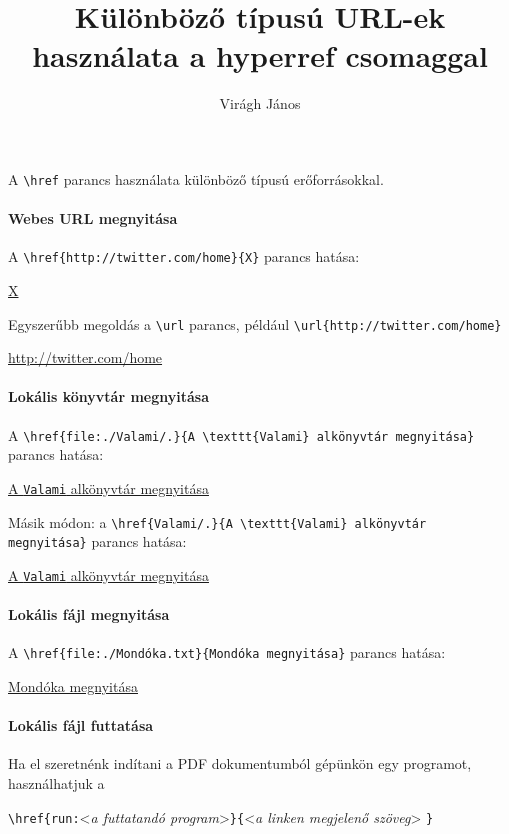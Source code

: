 \documentclass{article}
\title{Különböző típusú URL-ek használata a hyperref csomaggal}
\author{Virágh János}
\begin{document}
\maketitle
A \verb!\href! parancs használata különböző típusú erőforrásokkal.
\paragraph{Webes URL megnyitása}

A \verb!\href{http://twitter.com/home}{X}! parancs hatása:
\begin{center} 
\href{http://twitter.com/home}{X}	
\end{center}
Egyszerűbb megoldás a \verb!\url! parancs, például \verb!\url{http://twitter.com/home}!
\begin{center}
\url{http://twitter.com/home}
\end{center}
\paragraph{Lokális könyvtár megnyitása} 

A \verb!\href{file:./Valami/.}{A \texttt{Valami} alkönyvtár megnyitása}! parancs hatása:
\begin{center} 
\href{file:./Valami/.}{A \texttt{Valami} alkönyvtár megnyitása}
\end{center}

Másik módon: a \verb!\href{Valami/.}{A \texttt{Valami} alkönyvtár megnyitása}! parancs hatása:
\begin{center} 
\href{Valami/.}{A \texttt{Valami} alkönyvtár megnyitása}
\end{center}

\paragraph{Lokális fájl megnyitása} A \verb!\href{file:./Mondóka.txt}{Mondóka megnyitása}! parancs hatása:
\begin{center} 
\href{file:./Mondóka.txt}{Mondóka megnyitása}
\end{center} 

\paragraph{Lokális fájl futtatása} Ha el szeretnénk indítani a PDF dokumentumból gépünkön egy programot, használhatjuk a

\verb!\href{run:!<\textit{a futtatandó program}>\verb!}{!<\textit{a linken megjelenő szöveg}> \verb!}!
\end{document}
